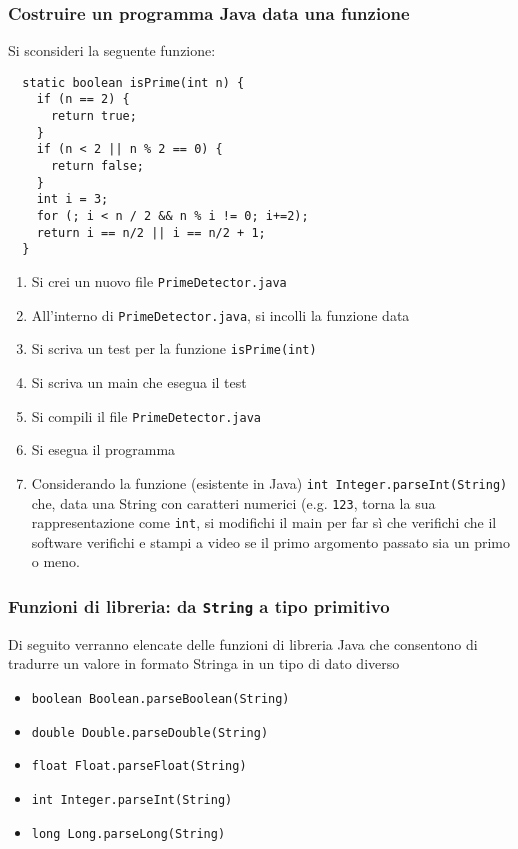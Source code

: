 \documentclass{beamer}
\begin{document}
\begin{frame}[fragile]
\frametitle{Costruire un programma Java data una funzione}
Si sconsideri la seguente funzione:
\scriptsize{}
\begin{verbatim}
  static boolean isPrime(int n) {
    if (n == 2) {
      return true;
    }
    if (n < 2 || n % 2 == 0) {
      return false;
    }
    int i = 3;
    for (; i < n / 2 && n % i != 0; i+=2);
    return i == n/2 || i == n/2 + 1;
  }\end{verbatim}
\begin{enumerate}
 \item Si crei un nuovo file \texttt{PrimeDetector.java}
 \item All'interno di \texttt{PrimeDetector.java}, si incolli la funzione data
 \item Si scriva un test per la funzione \texttt{isPrime(int)}
 \item Si scriva un main che esegua il test
 \item Si compili il file \texttt{PrimeDetector.java}
 \item Si esegua il programma
 \item Considerando la funzione (esistente in Java) \texttt{int Integer.parseInt(String)} che, data una String con caratteri numerici (e.g. \texttt{\textquotedbl{}123\textquotedbl{}}, torna la sua rappresentazione come \texttt{int}, si modifichi il main per far sì che verifichi che il software verifichi e stampi a video se il primo argomento passato sia un primo o meno.
\end{enumerate}
\end{frame}

\begin{frame}[fragile]
\frametitle{Funzioni di libreria: da \texttt{String} a tipo primitivo}
Di seguito verranno elencate delle funzioni di libreria Java che consentono di tradurre un valore in formato Stringa in un tipo di dato diverso
\begin{itemize}
 \item \texttt{boolean Boolean.parseBoolean(String)}
 \item \texttt{double Double.parseDouble(String)}
 \item \texttt{float Float.parseFloat(String)}
 \item \texttt{int Integer.parseInt(String)}
 \item \texttt{long Long.parseLong(String)}
\end{itemize}

\end{frame}
\end{document}
